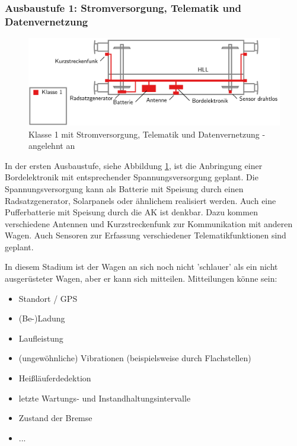 \subsubsection{Ausbaustufe 1: Stromversorgung, Telematik und Datenvernetzung}
\begin{figure}[hbp] 
    \includegraphics[width=\textwidth]{Bilder/Ausbaustufen_1.PNG}
    \caption{Klasse 1 mit Stromversorgung, Telematik und Datenvernetzung - angelehnt an \cite{ETR_3} }
    \label{fig:Klasse1}
\end{figure} 
In der ersten Ausbaustufe, siehe Abbildung \ref{fig:Klasse1}, ist die Anbringung einer Bordelektronik mit  entsprechender Spannungsversorgung geplant. Die Spannungsversorgung kann als Batterie mit Speisung durch einen Radsatzgenerator, Solarpanels oder ähnlichem realisiert werden. Auch eine Pufferbatterie mit Speisung durch die AK ist denkbar. Dazu kommen verschiedene Antennen und Kurzstreckenfunk zur Kommunikation mit anderen Wagen. Auch Sensoren zur Erfassung verschiedener Telematikfunktionen sind geplant.\par
In diesem Stadium ist der Wagen an sich noch nicht 'schlauer' als ein nicht ausgerüsteter Wagen, aber er kann sich mitteilen. Mitteilungen könne sein: 
\begin{itemize}
    \item Standort / GPS
    \item (Be-)Ladung
    \item Laufleistung
    \item (ungewöhnliche) Vibrationen (beispielsweise durch Flachstellen)
    \item Heißläuferdedektion
    \item letzte Wartungs- und Instandhaltungsintervalle
    \item Zustand der Bremse
    \item ...
\end{itemize}
